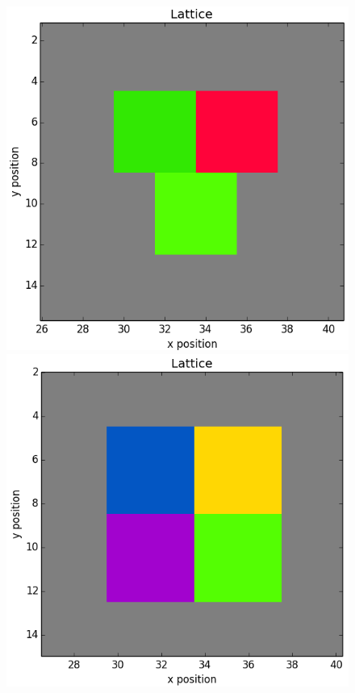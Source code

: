\documentclass[12pt]{article}
\begin{document}
\begin{figure}[h]
	\includegraphics[scale=0.20]{img/3ctc_start}
	\includegraphics[scale=0.20]{img/4ctc_start}

\end{figure}
\end{document}
